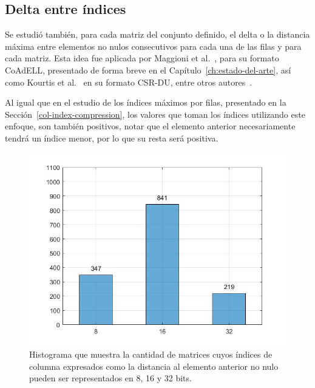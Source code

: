 \subsection{Delta entre índices}\label{delta}



Se estudió también, para cada matriz del conjunto definido, el delta o la distancia máxima entre elementos no nulos consecutivos para cada una de las filas y para cada matriz. %
Esta idea fue aplicada por Maggioni et al.~\cite{Maggioni2014}, para su formato CoAdELL, presentado de forma breve en el Capítulo~\ref{ch:estado-del-arte}, así como Kourtis et al.~\cite{Kourtis2008} en su formato CSR-DU, entre otros autores~\cite{Tang2013, Willcock2006}.

Al igual que en el estudio de los índices máximos por filas, presentado en la Sección~\ref{col-index-compression}, los valores que toman los índices utilizando este enfoque, son también positivos, notar que el elemento anterior necesariamente tendrá un índice menor, por lo que su resta será positiva.

\begin{figure}[h]
  \centering
  \includegraphics[width=.6\textwidth]{imagenes/chap4/hist_delta_dist_cat.jpg}
  \caption{%
  Histograma que muestra la cantidad de matrices cuyos índices de columna expresados como la distancia al elemento anterior no nulo pueden ser representados en 8, 16 y 32 bits.
  }
  \label{fig:hist_delta_dist_cat}
\end{figure}%

